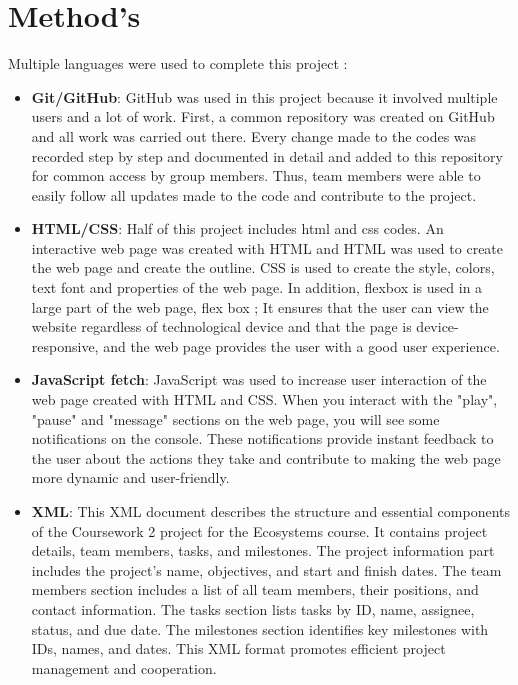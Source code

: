 \documentclass{article}
\begin{document}
\section{Method's}
Multiple languages were used to complete this project :
\begin{itemize}
    \item \textbf{Git/GitHub}: GitHub was used in this project because it involved multiple users and a lot of work. First, a common repository was created on GitHub and all work was carried out there. Every change made to the codes was recorded step by step and documented in detail and added to this repository for common access by group members. Thus, team members were able to easily follow all updates made to the code and contribute to the project.
    \item \textbf{HTML/CSS}: Half of this project includes html and css codes. An interactive web page was created with HTML and HTML was used to create the web page and create the outline. CSS is used to create the style, colors, text font and properties of the web page. In addition, flexbox is used in a large part of the web page, flex box ; It ensures that the user can view the website regardless of technological device and that the page is device-responsive, and the web page provides the user with a good user experience.
    \item \textbf{JavaScript fetch}: JavaScript was used to increase user interaction of the web page created with HTML and CSS. When you interact with the "play", "pause" and "message" sections on the web page, you will see some notifications on the console. These notifications provide instant feedback to the user about the actions they take and contribute to making the web page more dynamic and user-friendly.
    \item \textbf{XML}: 
This XML document describes the structure and essential components of the Coursework 2 project for the Ecosystems course. It contains project details, team members, tasks, and milestones. The project information part includes the project's name, objectives, and start and finish dates. The team members section includes a list of all team members, their positions, and contact information. The tasks section lists tasks by ID, name, assignee, status, and due date. The milestones section identifies key milestones with IDs, names, and dates. This XML format promotes efficient project management and cooperation.

\end{itemize}
\end{document}
